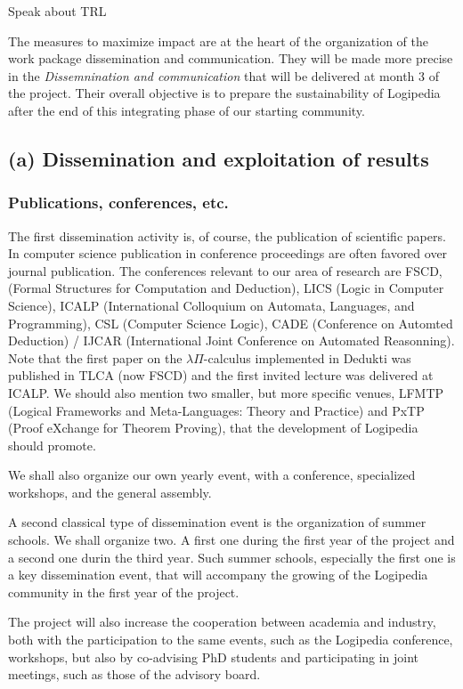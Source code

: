 {\color{red} Speak about TRL}

The measures to maximize impact are at the heart of the organization
of the work package dissemination and communication. They will be made
more precise in the {\em Dissemnination and communication} that will
be delivered at month 3 of the project. Their overall objective is to
prepare the sustainability of Logipedia after the end of this
integrating phase of our starting community.

\subsection*{(a) Dissemination and exploitation of results}
\label{sec:dissemination}

\subsubsection*{Publications, conferences, etc.}

The first dissemination activity is, of course, the publication of
scientific papers. In computer science publication in conference
proceedings are often favored over journal publication. The
conferences relevant to our area of research are FSCD, (Formal
Structures for Computation and Deduction), LICS (Logic in Computer
Science), ICALP (International Colloquium on Automata, Languages, and
Programming), CSL (Computer Science Logic), CADE (Conference on
Automted Deduction) / IJCAR (International Joint Conference on
Automated Reasonning). Note that the first paper on the $\lambda
\Pi$-calculus implemented in Dedukti was published in TLCA (now FSCD)
and the first invited lecture was delivered at ICALP. We should also
mention two smaller, but more specific venues, LFMTP (Logical
Frameworks and Meta-Languages: Theory and Practice) and PxTP (Proof
eXchange for Theorem Proving), that the development of Logipedia
should promote.

We shall also organize our own yearly event, with a conference,
specialized workshops, and the general assembly.

A second classical type of dissemination event is the organization of
summer schools. We shall organize two. A first one during the first
year of the project and a second one durin the third year. Such summer
schools, especially the first one is a key dissemination event, that
will accompany the growing of the Logipedia community in the first
year of the project.

The project will also increase the cooperation between academia and
industry, both with the participation to the same events, such as the
Logipedia conference, workshops, but also by co-advising PhD students
and participating in joint meetings, such as those of the advisory
board.

